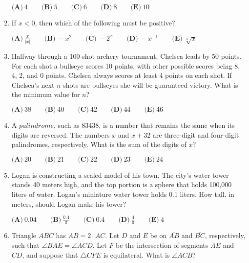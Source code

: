\documentclass{article}
\begin{document}
\begin{enumerate}[label=\arabic*., itemsep=0.5em]
\(\textbf{(A)}\ 4 \qquad \textbf{(B)}\ 5 \qquad \textbf{(C)}\ 6 \qquad \textbf{(D)}\ 8 \qquad \textbf{(E)}\ 10\)\par \vspace{0.5em}\item If \(x<0\), then which of the following must be positive?

\(\textbf{(A)}\ \frac{x}{\left|x\right|} \qquad \textbf{(B)}\ -x^2 \qquad \textbf{(C)}\ -2^x \qquad \textbf{(D)}\ -x^{-1} \qquad \textbf{(E)}\ \sqrt[3]{x}\)\par \vspace{0.5em}\item Halfway through a 100-shot archery tournament, Chelsea leads by 50 points. For each shot a bullseye scores 10 points, with other possible scores being 8, 4, 2, and 0 points. Chelsea always scores at least 4 points on each shot. If Chelsea's next \(n\) shots are bullseyes she will be guaranteed victory. What is the minimum value for \(n\)?

\(\textbf{(A)}\ 38 \qquad \textbf{(B)}\ 40 \qquad \textbf{(C)}\ 42 \qquad \textbf{(D)}\ 44 \qquad \textbf{(E)}\ 46\)\par \vspace{0.5em}\item A \(\textit{palindrome}\), such as 83438, is a number that remains the same when its digits are reversed. The numbers \(x\) and \(x+32\) are three-digit and four-digit palindromes, respectively. What is the sum of the digits of \(x\)?

\(\textbf{(A)}\ 20 \qquad \textbf{(B)}\ 21 \qquad \textbf{(C)}\ 22 \qquad \textbf{(D)}\ 23 \qquad \textbf{(E)}\ 24\)\par \vspace{0.5em}\item Logan is constructing a scaled model of his town. The city's water tower stands 40 meters high, and the top portion is a sphere that holds 100,000 liters of water. Logan's miniature water tower holds 0.1 liters. How tall, in meters, should Logan make his tower?

\(\textbf{(A)}\ 0.04 \qquad \textbf{(B)}\ \frac{0.4}{\pi} \qquad \textbf{(C)}\ 0.4 \qquad \textbf{(D)}\ \frac{4}{\pi} \qquad \textbf{(E)}\ 4\)\par \vspace{0.5em}\item Triangle \(ABC\) has \(AB=2 \cdot AC\). Let \(D\) and \(E\) be on \(\overline{AB}\) and \(\overline{BC}\), respectively, such that \(\angle BAE = \angle ACD\). Let \(F\) be the intersection of segments \(AE\) and \(CD\), and suppose that \(\triangle CFE\) is equilateral. What is \(\angle ACB\)?


\end{enumerate}
\end{document}

